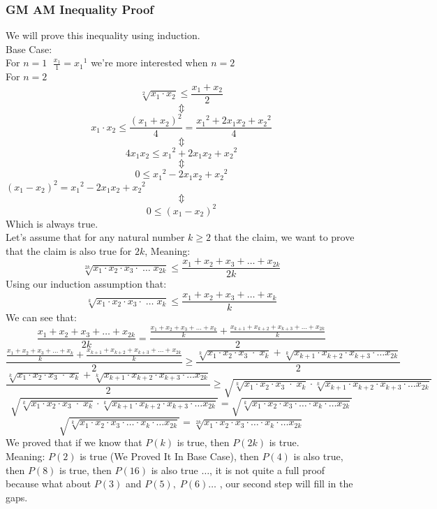 \subsubsection{GM AM Inequality Proof}
We will prove this inequality using induction.\\
Base Case:\\
For $n = 1\;$ $\frac{x_1}{1} = {x_1}^1$ we're more interested when $n = 2$\\
For $n = 2\;$
\[
    \sqrt[2]{x_1\cdot x_2} \leq \frac{x_1+x_2}{2}
\]
\[
    \Updownarrow 
\]
\[
    x_1\cdot x_2 \leq \frac{(x_1+x_2)^2}{4} = \frac{{x_1}^2+2x_1x_2+{x_2}^2}{4}
\]
\[
    \Updownarrow
\]
\[
    4x_1x_2\leq {x_1}^2+2x_1x_2+{x_2}^2
\]
\[
    \Updownarrow
\]
\[
    0\leq {x_1}^2-2x_1x_2+{x_2}^2
\]
$(x_1-x_2)^2 = {x_1}^2-2x_1x_2+{x_2}^2$
\[
    \Updownarrow
\]
\[
    0\leq (x_1-x_2)^2
\]
Which is always true.\\
Let's assume that for any natural number $k\geq 2$ that the claim, we want to prove that the claim is also true for $2k$, Meaning:\\
\[
    \sqrt[2k]{x_1\cdot x_2\cdot x_3\cdot\; \ldots\; x_{2k}}\leq \frac{x_1+x_2+x_3+\ldots+x_{2k}}{2k}
\]
Using our induction assumption that:\\
\[
    \sqrt[k]{x_1\cdot x_2\cdot x_3\cdot\; \ldots\; x_{k}}\leq \frac{x_1+x_2+x_3+\ldots+x_{k}}{k}
\]
We can see that:\\
\[
    \frac{x_1+x_2+x_3+\ldots+x_{2k}}{2k} = \frac{\frac{x_1+x_2+x_3+\ldots+x_{k}}{k}+\frac{x_{k+1}+x_{k+2}+x_{k+3}+\ldots+x_{2k}}{k}}{2}
\]
\[
    \frac{\frac{x_1+x_2+x_3+\ldots+x_{k}}{k}+\frac{x_{k+1}+x_{k+2}+x_{k+3}+\ldots+x_{2k}}{k}}{2}\geq \frac{\sqrt[k]{x_1\cdot x_2\cdot x_3\; \cdot\;x_k} + \sqrt[k]{x_{k+1}\cdot x_{k+2}\cdot x_{k+3}\cdot \ldots x_{2k}}}{2}
\]
\[
    \frac{\sqrt[k]{x_1\cdot x_2\cdot x_3\; \cdot\;x_k} + \sqrt[k]{x_{k+1}\cdot x_{k+2}\cdot x_{k+3}\cdot \ldots x_{2k}}}{2} \geq \sqrt{\sqrt[k]{x_1\cdot x_2\cdot x_3\; \cdot\;x_k}\cdot \sqrt[k]{x_{k+1}\cdot x_{k+2}\cdot x_{k+3}\cdot \ldots x_{2k}}}
\]
\[
    \sqrt{\sqrt[k]{x_1\cdot x_2\cdot x_3\; \cdot\;x_k}\cdot \sqrt[k]{x_{k+1}\cdot x_{k+2}\cdot x_{k+3}\cdot \ldots x_{2k}}} = \sqrt{\sqrt[k]{x_1\cdot x_2\cdot x_3\cdot \ldots\cdot x_k\cdot \ldots x_{2k}}}
\]
\[
    \sqrt{\sqrt[k]{x_1\cdot x_2\cdot x_3\cdot \ldots\cdot x_k\cdot \ldots x_{2k}}} = \sqrt[2k]{x_1\cdot x_2\cdot x_3\cdot \ldots\cdot x_k\cdot \ldots x_{2k}}
\]
We proved that if we know that $P(k)$ is true, then $P(2k)$ is true.\\
Meaning: $P(2)$ is true (We Proved It In Base Case), then $P(4)$ is also true, then $P(8)$ is true, then $P(16)$ is also true $\ldots$, it is not quite a full proof because what about $P(3)$ and $P(5),\;P(6) \ldots$ , our second step will fill in the gaps.\\
